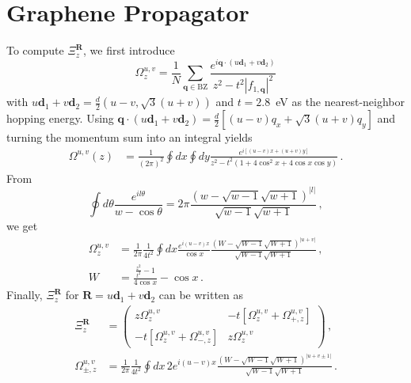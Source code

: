 \documentclass[aps, prb, superscriptaddress, preprint, floatfix]{revtex4-1}
\begin{document}
\section{Graphene Propagator}
\label{sec:Propagator}

To compute $\Xi_z^\mathbf{R}$, we first introduce
%
\begin{equation}
	\Omega^{u,v}_z =
	\frac{1}{N}\sum_{\mathbf{q}\in\mathrm{BZ}}
	\frac{
		e^{i\mathbf{q}\cdot \left(u\mathbf{d}_1 + v\mathbf{d}_2\right)}
	}
	{z^2 - t^2\left| f_{1,\mathbf{q}}\right|^2}
	\label{eqn:Omega_R}
\end{equation}
%
with $ u\mathbf{d}_1 + v\mathbf{d}_2 = \frac{d}{2}\left(u - v, \sqrt{3}\left(u+v\right)\right)$ and $t = 2.8$~eV as the nearest-neighbor hopping energy. Using $\mathbf{q}\cdot \left(u\mathbf{d}_1 + v\mathbf{d}_2\right)  = \frac{d}{2}\left[\left(u - v\right)q_x + \sqrt{3}\left(u+v\right)q_y\right]$ and turning the momentum sum into an integral yields
%
\begin{align}
	\Omega^{u,v}\left(z\right) 
	& = \frac{1}{\left(2\pi\right)^2}\oint dx \oint dy
	\frac
	{e^{i \left[\left(u - v\right)x + \left(u+v\right)y\right]}}
	{z^2 - t^2\left(1 + 4\cos^2 x + 4 \cos x\cos y \right)}\,.
	\label{eqn:Omega_R_2}
\end{align}
%
From
%
\begin{equation}
	\oint d\theta \frac{e^{il\theta}}{w-\cos\theta} = 2\pi \frac{\left(w - \sqrt{w - 1}\sqrt{w + 1}\right)^{|l|}}{\sqrt{w - 1}\sqrt{w + 1}}\,,
	\label{eqn:Ang_Int}
\end{equation}
%
we get
%
\begin{align}
	\Omega^{u,v}_z &= \frac{1}{2\pi}\frac{1}{4t^2}
	\oint dx \frac{e^{i\left(u - v\right)x}}{\cos x}\frac{\left(W - \sqrt{W - 1}\sqrt{W + 1}\right)^{|u+v|}}{\sqrt{W - 1}\sqrt{W + 1}}\,,
	\label{eqn:Omega_R_3}
	\\
	W &= \frac{\frac{z^2}{t^2}-1}{4\cos x}-\cos x\,.
	\label{eqn:W}
\end{align}
%
Finally, $\Xi^{\mathbf{R}}_z$ for $\mathbf{R} = u\mathbf{d}_1 + v\mathbf{d}_2$ can be written as
%
\begin{align}
	\Xi^{\mathbf{R}}_z 
	&=
	\begin{pmatrix}
		z\Omega^{u,v}_z
		&
		- t\left[\Omega^{u,v}_z + \Omega^{u,v}_{+,z} \right]
		\\
		- t\left[\Omega^{u,v}_z + \Omega^{u,v}_{-,z}\right]
		&
		z\Omega^{u,v}_z
	\end{pmatrix}\,,
	\\
	\Omega^{u,v}_{\pm,z}
	&= 
	 \frac{1}{2\pi}\frac{1}{4t^2}
	\oint dx \,2e^{i\left(u - v\right)x}\frac{\left(W - \sqrt{W - 1}\sqrt{W + 1}\right)^{|u+v\pm 1|}}{\sqrt{W - 1}\sqrt{W + 1}}
\,.
\end{align}
%
\end{document}
